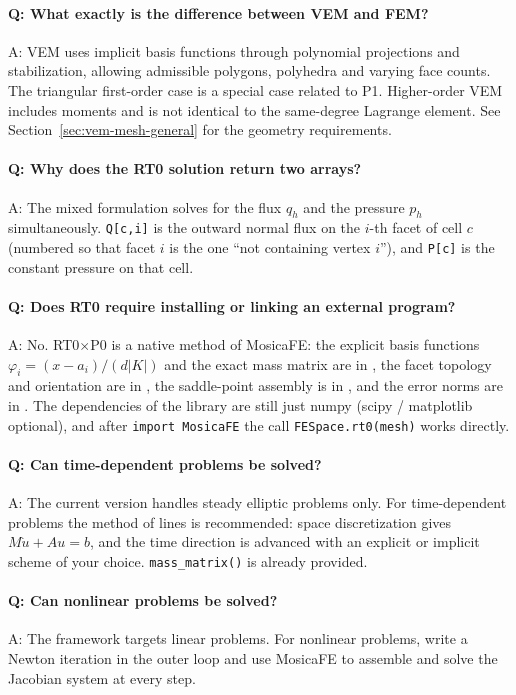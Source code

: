 \documentclass[11pt,oneside]{book}
\theoremstyle{definition}
\theoremstyle{plain}
\newcommand{\mosica}{\textsf{MosicaFE}}
\newcommand{\code}[1]{\texttt{#1}}
\begin{document}
\paragraph{Q: What exactly is the difference between VEM and FEM?}
A: VEM uses implicit basis functions through polynomial projections and stabilization,
allowing admissible polygons, polyhedra and varying face counts. The triangular
first-order case is a special case related to P1. Higher-order VEM includes moments
and is not identical to the same-degree Lagrange element. See
Section~\ref{sec:vem-mesh-general} for the geometry requirements.

\paragraph{Q: Why does the RT0 solution return two arrays?}
A: The mixed formulation solves for the flux $q_h$ and the pressure $p_h$
simultaneously. \code{Q[c,\allowbreak i]} is the outward normal flux on the $i$-th facet of cell
$c$ (numbered so that facet $i$ is the one ``not containing vertex $i$''), and
\code{P[c]} is the constant pressure on that cell.

\paragraph{Q: Does RT0 require installing or linking an external program?}
A: No. RT0$\times$P0 is a native method of \mosica{}: the explicit basis functions
$\varphi_i=(x-a_i)/(d|K|)$ and the exact mass matrix are in , the
facet topology and orientation are in , the saddle-point
assembly is in , and the error norms are in
. The dependencies of the library are still just numpy
(scipy / matplotlib optional), and after \code{import MosicaFE} the call
\code{FESpace.rt0(mesh)} works directly.

\paragraph{Q: Can time-dependent problems be solved?}
A: The current version handles steady elliptic problems only. For time-dependent
problems the method of lines is recommended: space discretization gives
$M\dot u+Au=b$, and the time direction is advanced with an explicit or implicit
scheme of your choice. \code{mass\_\allowbreak matrix()} is already provided.

\paragraph{Q: Can nonlinear problems be solved?}
A: The framework targets linear problems. For nonlinear problems, write a Newton
iteration in the outer loop and use \mosica{} to assemble and solve the Jacobian
system at every step.
\end{document}
